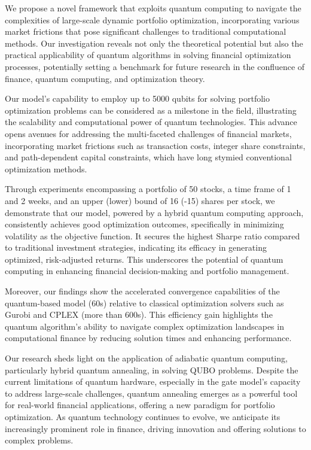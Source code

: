 We propose a novel framework that exploits quantum computing to navigate the complexities of large-scale dynamic portfolio optimization, incorporating various market frictions that pose significant challenges to traditional computational methods. Our investigation reveals not only the theoretical potential but also the practical applicability of quantum algorithms in solving financial optimization processes, potentially setting a benchmark for future research in the confluence of finance, quantum computing, and optimization theory.

Our model's capability to employ up to 5000 qubits for solving portfolio optimization problems can be considered as a milestone in the field, illustrating the scalability and computational power of quantum technologies. This advance opens avenues for addressing the multi-faceted challenges of financial markets, incorporating market frictions such as transaction costs, integer share constraints, and path-dependent capital constraints, which have long stymied conventional optimization methods.

Through experiments encompassing a portfolio of 50 stocks, a time frame of 1 and 2 weeks, and an upper (lower) bound of 16 (-15) shares per stock, we demonstrate that our model, powered by a hybrid quantum computing approach, consistently achieves good optimization outcomes, specifically in minimizing volatility as the objective function. It secures the highest Sharpe ratio compared to traditional investment strategies, indicating its efficacy in generating optimized, risk-adjusted returns. This underscores the potential of quantum computing in enhancing financial decision-making and portfolio management.

Moreover, our findings show the accelerated convergence capabilities of the quantum-based model (60s) relative to classical optimization solvers such as Gurobi and CPLEX (more than 600s). This efficiency gain highlights the quantum algorithm's ability to navigate complex optimization landscapes in computational finance by reducing solution times and enhancing performance.

Our research sheds light on the application of adiabatic quantum computing, particularly hybrid quantum annealing, in solving QUBO problems. Despite the current limitations of quantum hardware, especially in the gate model's capacity to address large-scale challenges, quantum annealing emerges as a powerful tool for real-world financial applications, offering a new paradigm for portfolio optimization. As quantum technology continues to evolve, we anticipate its increasingly prominent role in finance, driving innovation and offering solutions to complex problems. 